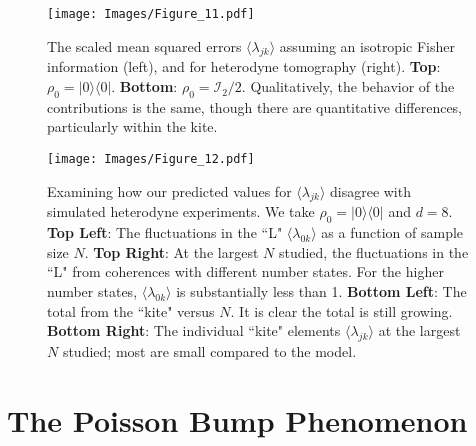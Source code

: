 \documentclass[aps,pra, twocolumn]{revtex4}
\begin{document}
\begin{figure}[h]
  \texttt{[image: Images/Figure\_11.pdf]}
 \caption{The scaled mean squared errors $\langle \lambda_{jk} \rangle$ assuming an isotropic Fisher information (left), and for heterodyne tomography (right). \textbf{Top}: $\rho_{0} = |0\rangle\langle 0|$. \textbf{Bottom}: $\rho_{0} = \mathcal{I}_{2}/2$. Qualitatively, the behavior of the contributions is the same, though there are quantitative differences, particularly within the
kite.}
\label{fig:model_comparison}
\end{figure}


\begin{figure}[h]
  \texttt{[image: Images/Figure\_12.pdf]}
 \caption{Examining how our predicted values for $\langle \lambda_{jk} \rangle$ disagree with simulated heterodyne experiments. We take $\rho_{0} = |0\rangle\langle 0|$ and $d=8$. \textbf{Top Left}: The fluctuations in the ``L" $\langle \lambda_{0k}\rangle$ as a function of sample size $N$.  \textbf{Top Right}: At the largest $N$ studied, the fluctuations in the ``L" from coherences with different number states. For the higher number states, $\langle \lambda_{0k}\rangle$ is substantially less than 1. \textbf{Bottom Left}: The total from the ``kite" versus $N$. It is clear the total is still growing. \textbf{Bottom Right}: The individual ``kite" elements $\langle \lambda_{jk}\rangle$ at the largest $N$ studied;  most are small compared to the model.}
\label{fig:individcontrib}
\end{figure}



\section{The Poisson Bump Phenomenon}
\label{app:poisson}
\end{document}
